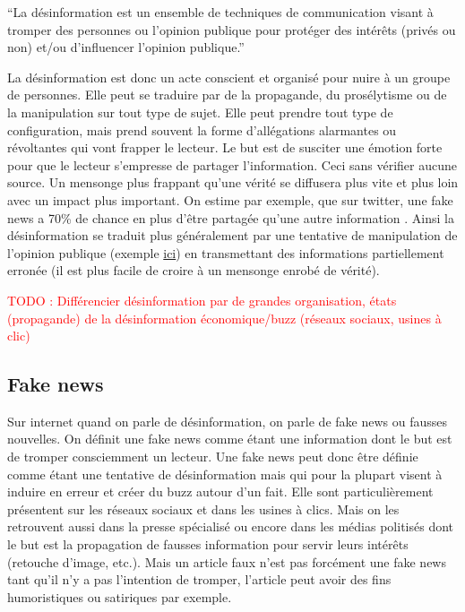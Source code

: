 \documentclass[12pt]{article}
\newcommand\todo[1]{\textcolor{red}{TODO : #1}}
\begin{document}
\enquote{La désinformation est un ensemble de techniques de communication visant à tromper des personnes ou l'opinion publique pour protéger des intérêts (privés ou non) et/ou d'influencer l'opinion publique.} \cite{wiki:desinformation}

La désinformation est donc un acte conscient et organisé pour nuire à un groupe de personnes. Elle peut se traduire par de la propagande, du prosélytisme ou de la manipulation sur tout type de sujet. Elle peut prendre tout type de configuration, mais prend souvent la forme d'allégations alarmantes ou révoltantes qui vont frapper le lecteur. Le but est de susciter une émotion forte pour que le lecteur s'empresse de partager l'information. Ceci sans vérifier aucune source. Un mensonge plus frappant qu'une vérité se diffusera plus vite et plus loin avec un impact plus important. On estime par exemple, que sur twitter, une fake news a 70\% de chance en plus d'être partagée qu'une autre information \cite{vosoughi2017rumor}. 
Ainsi la désinformation se traduit plus généralement par une tentative de manipulation de l'opinion publique (exemple \href{https://www.20minutes.fr/societe/2261439-20180426-video-evacuation-tolbiac-retour-naissance-fake-news}{ici}) en transmettant des informations partiellement erronée (il est plus facile de croire à un mensonge enrobé de vérité).

\todo{Différencier désinformation par de grandes organisation, états (propagande) de la désinformation économique/buzz (réseaux sociaux, usines à clic)}

\subsection{Fake news}

Sur internet quand on parle de désinformation, on parle de fake news ou fausses nouvelles. On définit une fake news comme étant une information dont le but est de tromper consciemment un lecteur. Une fake news peut donc être définie comme étant une tentative de désinformation mais qui pour la plupart visent à induire en erreur et créer du buzz autour d'un fait. Elle sont particulièrement présentent sur les réseaux sociaux et dans les usines à clics. Mais on les retrouvent aussi dans la presse spécialisé ou encore dans les médias politisés dont le but est la propagation de fausses information pour servir leurs intérêts (retouche d'image, etc.).  Mais un article faux n'est pas forcément une fake news tant qu'il n'y a pas l'intention de tromper, l'article peut avoir des fins humoristiques ou satiriques par exemple.
\end{document}
